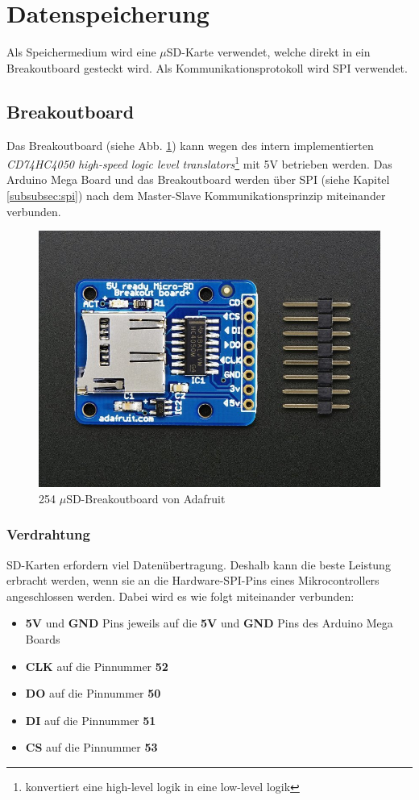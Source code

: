 \section{Datenspeicherung}
Als Speichermedium wird eine $\mu$SD-Karte verwendet, welche direkt in ein Breakoutboard gesteckt wird. Als Kommunikationsprotokoll wird SPI verwendet.\\
\subsection{Breakoutboard}
Das Breakoutboard (siehe Abb. \ref{fig:muSDBreakout}) kann wegen des intern implementierten \textit{CD74HC4050 high-speed logic level translators}\footnote{konvertiert eine high-level logik in eine low-level logik} mit 5V betrieben werden. Das Arduino Mega Board und das Breakoutboard werden über SPI (siehe Kapitel \ref{subsubsec:spi}) nach dem Master-Slave Kommunikationsprinzip miteinander verbunden. 
\begin{figure}[h]
\centering
\includegraphics[width=0.5\linewidth]{graphics/Datenspeicherung/micro_sd_card_breakout.png}
\caption{254 $\mu$SD-Breakoutboard von Adafruit \cite{ladyada2018}}
\label{fig:muSDBreakout}
\end{figure}

\subsubsection{Verdrahtung}
SD-Karten erfordern viel Datenübertragung. Deshalb kann die beste Leistung erbracht werden, wenn sie an die Hardware-SPI-Pins eines Mikrocontrollers angeschlossen werden. Dabei wird es wie folgt miteinander verbunden: \cite{ladyada2018}
\begin{itemize}
\item \textbf{5V} und \textbf{GND} Pins jeweils auf die \textbf{5V} und \textbf{GND} Pins des Arduino Mega Boards
\item \textbf{CLK} auf die Pinnummer \textbf{52}
\item \textbf{DO} auf die Pinnummer \textbf{50}
\item \textbf{DI} auf die Pinnummer \textbf{51}
\item \textbf{CS} auf die Pinnummer \textbf{53}
\end{itemize}
\newpage

